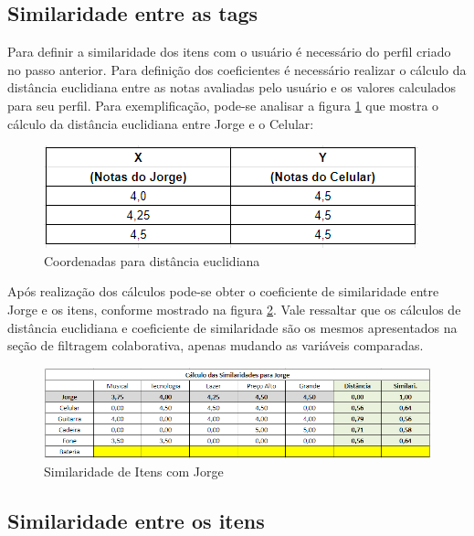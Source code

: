 \subsection{Similaridade entre as tags}

Para definir a similaridade dos itens com o usuário é necessário do perfil criado no passo anterior. Para definição dos coeficientes é necessário realizar o cálculo da distância euclidiana entre as notas avaliadas pelo usuário e os valores calculados para seu perfil. Para exemplificação, pode-se analisar a figura \ref{fig:coordenadasConteudo} que mostra o cálculo da distância euclidiana entre Jorge e o Celular:

\begin{figure}[H]
	\centering
	\includegraphics[width=.8\linewidth]{imagens/coordenadasConteudo.PNG}
	\caption[Coordenadas para distância euclidiana]{Coordenadas para distância euclidiana}
    \label{fig:coordenadasConteudo}
\end{figure}

Após realização dos cálculos pode-se obter o coeficiente de similaridade entre Jorge e os itens, conforme mostrado na figura \ref{fig:similaridadeConteudo}. Vale ressaltar que os cálculos de distância euclidiana e coeficiente de similaridade são os mesmos apresentados na seção de filtragem colaborativa, apenas mudando as variáveis comparadas. 

\begin{figure}[H]
	\centering
	\includegraphics[width=1\linewidth]{imagens/similaridadeConteudo.PNG}
	\caption[Similaridade de Itens com Jorge]{Similaridade de Itens com Jorge}
    \label{fig:similaridadeConteudo}
\end{figure}

\subsection{Similaridade entre os itens}

